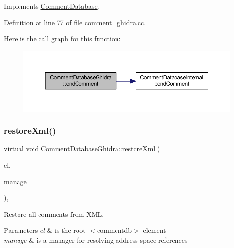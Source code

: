 Implements \mbox{\hyperlink{class_comment_database_a51e0634dc24c921507426298910336f4}{Comment\+Database}}.



Definition at line 77 of file comment\+\_\+ghidra.\+cc.

Here is the call graph for this function\+:
\nopagebreak
\begin{figure}[H]
\begin{center}
\leavevmode
\includegraphics[width=350pt]{class_comment_database_ghidra_aab66e37f898fbd4f15dedfe11d024b9c_cgraph}
\end{center}
\end{figure}
\mbox{\label{class_comment_database_ghidra_ab787aca7833ed057ba06d82fc258e738}} 
\subsubsection{\texorpdfstring{restoreXml()}{restoreXml()}}
{\footnotesize\ttfamily virtual void Comment\+Database\+Ghidra\+::restore\+Xml (\begin{DoxyParamCaption}\item[{const \mbox{\hyperlink{class_element}{Element}} $\ast$}]{el,  }\item[{const \mbox{\hyperlink{class_addr_space_manager}{Addr\+Space\+Manager}} $\ast$}]{manage }\end{DoxyParamCaption})\hspace{0.3cm}{\ttfamily [inline]}, {\ttfamily [virtual]}}



Restore all comments from X\+ML. 


\begin{DoxyParams}{Parameters}
{\em el} & is the root $<$commentdb$>$ element \\
\hline
{\em manage} & is a manager for resolving address space references \\
\hline
\end{DoxyParams}


